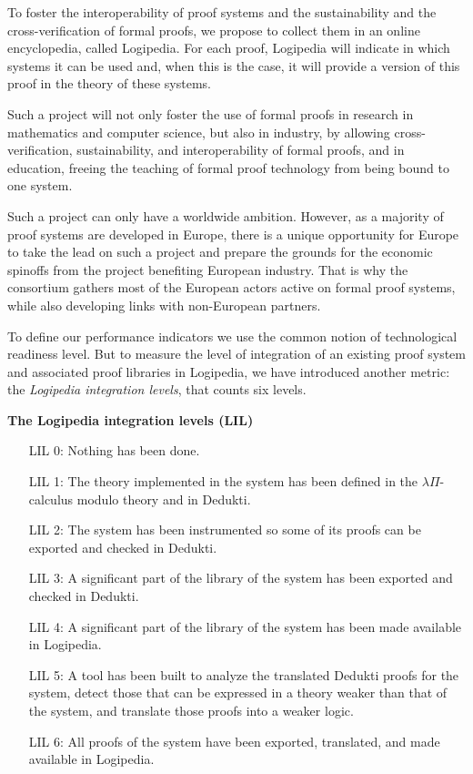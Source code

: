 To foster the interoperability of proof systems and the sustainability
and the cross-verification of formal proofs, we propose to collect
them in an online encyclopedia, called Logipedia.  For each proof,
Logipedia will indicate in which systems it can be used and, when this
is the case, it will provide a version of this proof in the theory of
these systems.

Such a project will not only foster the use of formal proofs in
research in mathematics and computer science, but also in industry, by
allowing cross-verification, sustainability, and interoperability of
formal proofs, and in education, freeing the teaching of formal proof
technology from being bound to one system.

Such a project can only have a worldwide ambition. However, as a
majority of proof systems are developed in Europe, there is a unique
opportunity for Europe to take the lead on such a project and prepare
the grounds for the economic spinoffs from the project benefiting
European industry. That is why the consortium gathers most of the
European actors active on formal proof systems, while also developing
links with non-European partners.

To define our performance indicators we use the common notion of
technological readiness level. But to measure the level of integration
of an existing proof system and associated proof libraries in Logipedia,
we have introduced another metric: the {\em Logipedia integration
  levels}, that counts six levels.

\begin{framed}
\begin{center}
{\bf The Logipedia integration levels (LIL)\label{lil}}
\end{center}

\begin{itemize}
\item[LIL 0:] Nothing has been done.

\item[LIL 1:] The theory implemented in the system has been defined in
  the $\lambda\Pi$-calculus modulo theory and in Dedukti.

\item[LIL 2:] The system has been instrumented so some of its proofs
  can be exported and checked in Dedukti.

\item[LIL 3:] A significant part of the library of the system has been
  exported and checked in Dedukti.

\item[LIL 4:] A significant part of the library of the system has
  been made available in Logipedia.

\item[LIL 5:] A tool has been built to analyze the translated Dedukti proofs
  for the system, detect those that can be expressed in a theory
  weaker than that of the system, and translate those proofs into a
  weaker logic.

\item[LIL 6:] All proofs of the system have been exported, translated,
  and made available in Logipedia.
\end{itemize}
\end{framed}

